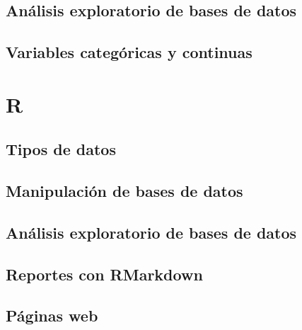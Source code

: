 \documentclass[
]{book}
\begin{document}
\hypertarget{anuxe1lisis-exploratorio-de-bases-de-datos-1}{%
\section{Análisis exploratorio de bases de datos}\label{anuxe1lisis-exploratorio-de-bases-de-datos-1}}

\hypertarget{variables-categuxf3ricas-y-continuas}{%
\section{Variables categóricas y continuas}\label{variables-categuxf3ricas-y-continuas}}

\hypertarget{r}{%
\chapter{R}\label{r}}

\hypertarget{tipos-de-datos-1}{%
\section{Tipos de datos}\label{tipos-de-datos-1}}

\hypertarget{manipulaciuxf3n-de-bases-de-datos-2}{%
\section{Manipulación de bases de datos}\label{manipulaciuxf3n-de-bases-de-datos-2}}

\hypertarget{anuxe1lisis-exploratorio-de-bases-de-datos-2}{%
\section{Análisis exploratorio de bases de datos}\label{anuxe1lisis-exploratorio-de-bases-de-datos-2}}

\hypertarget{reportes-con-rmarkdown}{%
\section{Reportes con RMarkdown}\label{reportes-con-rmarkdown}}

\hypertarget{puxe1ginas-web}{%
\section{Páginas web}\label{puxe1ginas-web}}

  
\end{document}
